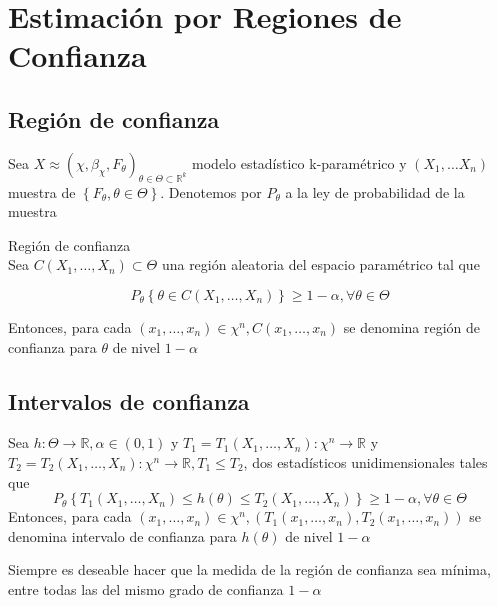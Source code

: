 \section{Estimación por Regiones de Confianza}

\subsection{Región de confianza}
Sea $X \approx\left(\chi, \beta_{\chi}, F_{\theta}\right)_{\theta \in \Theta
    \subset \mathbb{R}^{k}}$ modelo estadístico k-paramétrico y $\left(X_{1},
    \ldots X_{n}\right)$ muestra de $\left\{F_{\theta}, \theta \in \Theta\right\}$.
Denotemos por $P_{\theta}$ a la ley de probabilidad de la muestra

Región de confianza\\ Sea $C\left(X_{1}, \ldots, X_{n}\right) \subset \Theta$
una región aleatoria del espacio paramétrico tal que

$$
    P_{\theta}\left\{\theta \in C\left(X_{1}, \ldots, X_{n}\right)\right\} \geq 1-\alpha, \forall \theta \in \Theta
$$

Entonces, para cada $\left(x_{1}, \ldots, x_{n}\right) \in \chi^{n},
    C\left(x_{1}, \ldots, x_{n}\right)$ se denomina región de confianza para
$\theta$ de nivel $1-\alpha$

\subsection{Intervalos de confianza}

\begin{definición}
Sea $h: \Theta \rightarrow \mathbb{R}, \alpha \in(0,1)$ y $T_{1}=T_{1}\left(X_{1}, \ldots, X_{n}\right): \chi^{n} \rightarrow \mathbb{R}$ y $T_{2}=T_{2}\left(X_{1}, \ldots, X_{n}\right): \chi^{n} \rightarrow \mathbb{R}, T_{1} \leq T_{2}$, dos estadísticos unidimensionales tales que
$$P_{\theta}\left\{T_{1}\left(X_{1}, \ldots, X_{n}\right) \leq h(\theta) \leq T_{2}\left(X_{1}, \ldots, X_{n}\right)\right\} \geq 1-\alpha, \forall \theta \in \Theta$$
Entonces, para cada $\left(x_{1}, \ldots, x_{n}\right) \in \chi^{n},\left(T_{1}\left(x_{1}, \ldots, x_{n}\right), T_{2}\left(x_{1}, \ldots, x_{n}\right)\right)$ se denomina intervalo de confianza para $h(\theta)$ de nivel $1-\alpha$
\end{definición}

\begin{observación}
Siempre es deseable hacer que la medida de la región de confianza sea mínima, entre todas las del mismo grado de confianza $1-\alpha$
\end{observación}

